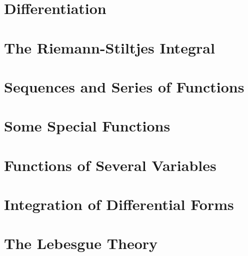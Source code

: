 \documentclass[UTF8]{ctexart}
\theoremstyle{thm}
\theoremstyle{dfn}
\theoremstyle{named}
\begin{document}
\section{Differentiation}
% 
% 
% 
% 
% 
% 
% 
\newpage

\section{The Riemann-Stiltjes Integral}
% 
\newpage

\section{Sequences and Series of Functions}
% 
\newpage

\section{Some Special Functions}
% 
\newpage

\section{Functions of Several Variables}
% 
\newpage

\section{Integration of Differential Forms}
% 
\newpage

\section{The Lebesgue Theory}
% 
\newpage
\end{document}
